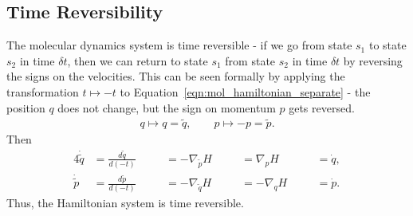 \documentclass[../Main.tex]{subfiles}
\begin{document}
\subsection{Time Reversibility}
The molecular dynamics system is time reversible - if we go from state $s_{1}$ to state $s_{2}$ in time $\delta t$, then we can return to state $s_{1}$ from state $s_{2}$ in time $\delta t$ by reversing the signs on the velocities. This can be seen formally by applying the transformation $t \mapsto -t$ to Equation~\ref{eqn:mol_hamiltonian_separate} - the position $q$ does not change, but the sign on momentum $p$ gets reversed.
\begin{align*}
q \mapsto q = \tilde{q},  \quad \quad p \mapsto -p = \tilde{p}.
\end{align*}
Then
\begin{alignat*}{4}
	\dot{\tilde{q}} &= \frac{d\tilde{q}}{d\left(-t\right)} \quad &&= -\nabla_{\tilde{p}}H \quad &&= \nabla_{p}H \quad &&= \dot{q},\\
	\dot{\tilde{p}} &= \frac{d\tilde{p}}{d\left(-t\right)} \quad &&= -\nabla_{\tilde{q}}H \quad && =-\nabla_{q}H \quad &&= \dot{p}.
\end{alignat*}
Thus, the Hamiltonian system is time reversible.
\end{document}
